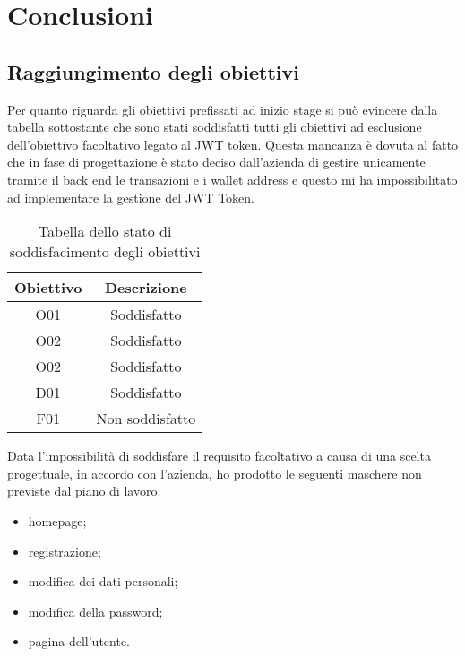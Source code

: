 
\chapter{Conclusioni}
\label{cap:conclusioni}

\section{Raggiungimento degli obiettivi}
\label{sec:raggiungimento-obiettivi}

Per quanto riguarda gli obiettivi prefissati ad inizio stage si può evincere dalla tabella sottostante che sono stati soddisfatti tutti gli obiettivi ad esclusione dell'obiettivo facoltativo legato al JWT token. Questa mancanza è dovuta al fatto che in fase di progettazione è stato deciso dall'azienda di gestire unicamente tramite il back end le transazioni e i wallet address e questo mi ha impossibilitato ad implementare la gestione del JWT Token.

\begin{table}[H]
	\caption{Tabella dello stato di soddisfacimento degli obiettivi}
	\label{tab:obiettivi-raggiunti}
	\renewcommand{\arraystretch}{1.6}
	\begin{center}
	\begin{tabularx}{0.4\textwidth}{c|c}
		\hline\hline
		\textbf{Obiettivo} & \textbf{Descrizione}\\
		\hline
		O01 & Soddisfatto\\
		\hline
		O02 & Soddisfatto\\
		\hline
		O02 & Soddisfatto\\
		\hline
		D01 & Soddisfatto\\
		\hline
		F01 & Non soddisfatto\\
		\hline
	\end{tabularx}
	\end{center}
\end{table}%

Data l'impossibilità di soddisfare il requisito facoltativo a causa di una scelta progettuale, in accordo con l'azienda, ho prodotto le seguenti maschere non previste dal piano di lavoro:
\begin{itemize}
	\item homepage;
	\item registrazione;
	\item modifica dei dati personali;
	\item modifica della password;
	\item pagina dell'utente.
\end{itemize}

